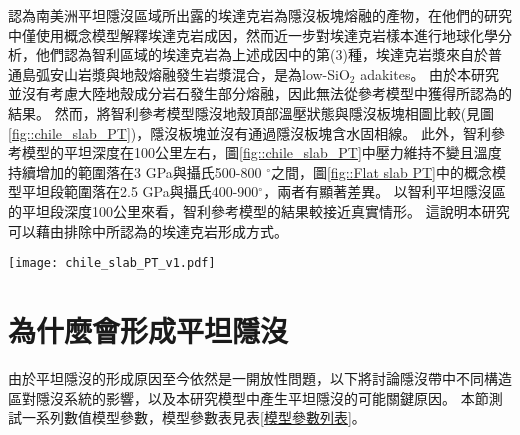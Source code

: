 \citealp{Gutscher2000Bcan}認為南美洲平坦隱沒區域所出露的埃達克岩為隱沒板塊熔融的產物，在他們的研究中僅使用概念模型解釋埃達克岩成因，然而\citealp{kay2002magmatism}近一步對埃達克岩樣本進行地球化學分析，他們認為智利區域的埃達克岩為上述成因中的第(3)種，埃達克岩漿來自於普通島弧安山岩漿與地殼熔融發生岩漿混合，是為low-SiO$_2$ adakites。
由於本研究並沒有考慮大陸地殼成分岩石發生部分熔融，因此無法從參考模型中獲得\citealp{kay2002magmatism}所認為的結果。
然而，將智利參考模型隱沒地殼頂部溫壓狀態與隱沒板塊相圖比較(見圖\ref{fig::chile_slab_PT})，隱沒板塊並沒有通過隱沒板塊含水固相線。
此外，智利參考模型的平坦深度在100公里左右，圖\ref{fig::chile_slab_PT}中壓力維持不變且溫度持續增加的範圍落在3 GPa與攝氏500-800 $^{\circ}$之間，圖\ref{fig::Flat slab PT}中\citealp{Gutscher2000Bcan}的概念模型平坦段範圍落在2.5 GPa與攝氏400-900$^{\circ}$，兩者有顯著差異。
以智利平坦隱沒區的平坦段深度100公里來看，智利參考模型的結果較接近真實情形。
這說明本研究可以藉由排除\citealp{Gutscher2000Bcan}中所認為的埃達克岩形成方式。

\begin{figure*}[ht!]
    \centering
    \texttt{[image: chile\_slab\_PT\_v1.pdf]}
    \caption[智利參考模型隱沒地殼頂部於40 Myr的溫壓圖]{智利參考模型隱沒地殼頂部於40 Myr的溫壓圖。其中綠線為本研究中玄武岩至榴輝岩的相變條件，橘色線為含水固相線。綠色點為隱沒地殼頂部每2-5公里的溫壓狀態。
    }
    \label{fig::chile_slab_PT}
\end{figure*}

\newpage
\section{為什麼會形成平坦隱沒}
由於平坦隱沒的形成原因至今依然是一開放性問題，以下將討論隱沒帶中不同構造區對隱沒系統的影響，以及本研究模型中產生平坦隱沒的可能關鍵原因。
本節測試一系列數值模型參數，模型參數表見表\ref{模型參數列表}。

